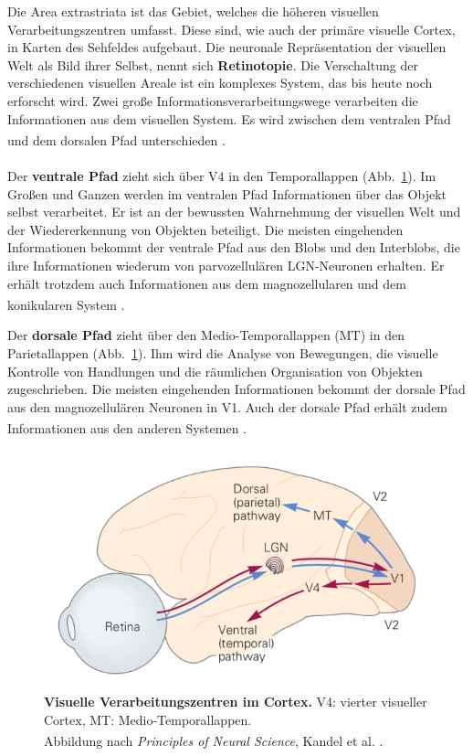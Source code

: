 \documentclass[12pt,a4paper,pdftex]{article}
\begin{document}
Die Area extrastriata ist das Gebiet, welches die höheren visuellen Verarbeitungszentren umfasst. Diese sind, wie auch der primäre visuelle Cortex, in Karten des Sehfeldes aufgebaut. Die neuronale Repräsentation der visuellen Welt als Bild ihrer Selbst, nennt sich \textbf{Retinotopie}.  Die Verschaltung der verschiedenen visuellen Areale ist ein komplexes System, das bis heute noch erforscht wird. Zwei große Informationsverarbeitungswege verarbeiten die Informationen aus dem visuellen System. Es wird zwischen dem ventralen Pfad und dem dorsalen Pfad unterschieden \textsuperscript{\cite[25]{kandel2013principles}}.
\\
\\ \noindent Der \textbf{ventrale Pfad} zieht sich über V4 in den Temporallappen (Abb.~\ref{fig:visual_pathway_cortex}). Im Großen und Ganzen werden im ventralen Pfad Informationen über das Objekt selbst verarbeitet. Er ist an der bewussten Wahrnehmung der visuellen Welt und der Wiedererkennung von Objekten beteiligt. Die meisten eingehenden Informationen bekommt der ventrale Pfad aus den Blobs und den Interblobs, die ihre Informationen wiederum von parvozellulären LGN-Neuronen erhalten. Er erhält trotzdem auch Informationen aus dem magnozellularen und dem konikularen System \textsuperscript{\cite[10]{neurowissenschaften_baer}}.


Der \textbf{dorsale Pfad} zieht über den Medio-Temporallappen (MT) in den Parietallappen (Abb.~\ref{fig:visual_pathway_cortex}). Ihm wird die Analyse von Bewegungen, die visuelle Kontrolle von Handlungen  
und die räumlichen Organisation von Objekten zugeschrieben. Die meisten eingehenden Informationen bekommt der dorsale Pfad aus den magnozellulären Neuronen in V1. Auch der dorsale Pfad erhält zudem Informationen aus den anderen Systemen \textsuperscript{\cite[10]{neurowissenschaften_baer}}.

\begin{figure}[H]
    \centering
    \includegraphics{pictures/visual/visual_Cortex.png}
    \caption[Visuelle Verarbeitungszentren im Cortex]{\textbf{Visuelle Verarbeitungszentren im Cortex.} V4: vierter visueller Cortex, MT: Medio-Temporallappen.\\
    Abbildung nach \textit{Principles of Neural Science}, Kandel et al. \textsuperscript{\cite[27]{kandel2013principles}}.}
    \label{fig:visual_pathway_cortex}
\end{figure}
\end{document}

